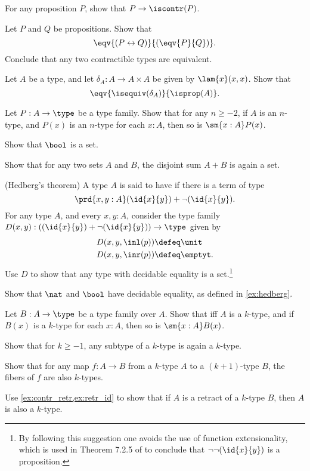\begin{exercises}
\item For any proposition $P$, show that $P\to\iscontr(P)$.
\item Let $P$ and $Q$ be propositions. Show that
\begin{equation*}
\eqv{(P\leftrightarrow Q)}{(\eqv{P}{Q})}.
\end{equation*}
Conclude that any two contractible types are equivalent.
\item Let $A$ be a type, and let $\delta_A:A\to A\times A$ be given by $\lam{x}(x,x)$. Show that
\begin{equation*}
\eqv{\isequiv(\delta_A)}{\isprop(A)}.
\end{equation*}
\item Let $P:A\to\type$ be a type family. Show that for any $n\geq-2$, if $A$ is an $n$-type, and $P(x)$ is an $n$-type for each $x:A$, then so is $\sm{x:A}P(x)$. 
\item Show that $\bool$ is a set.
\item Show that for any two sets $A$ and $B$, the disjoint sum $A+B$ is again a set.
\item \label{ex:hedberg}(Hedberg's theorem) A type $A$ is said to have  if there is a term of type
\begin{equation*}
\prd{x,y:A} (\id{x}{y})+\neg(\id{x}{y}).
\end{equation*}
For any type $A$, and every $x,y:A$, consider the type family $D(x,y):((\id{x}{y})+\neg(\id{x}{y}))\to\type$ given by
\begin{align*}
D(x,y,\inl(p)) & \defeq \unit \\
D(x,y,\inr(p)) & \defeq \emptyt.
\end{align*}
Use $D$ to show that any type with decidable equality is a set.\footnote{By following this suggestion one avoids the use of function extensionality, which is used in Theorem 7.2.5 of \cite{hottbook} to conclude that $\neg\neg(\id{x}{y})$ is a proposition.}
\item Show that $\nat$ and $\bool$ have decidable equality, as defined in \autoref{ex:hedberg}.
\item 
\begin{subexenum}
\item Let $B:A\to\type$ be a type family over $A$. Show that iff $A$ is a $k$-type, and if $B(x)$ is a $k$-type for each $x:A$, then so is $\sm{x:A}B(x)$.
\item Show that for $k\geq -1$, any subtype of a $k$-type is again a $k$-type.
\item Show that for any map $f:A\to B$ from a $k$-type $A$ to a $(k+1)$-type $B$, the fibers of $f$ are also $k$-types.
\end{subexenum}
\item Use \autoref{ex:contr_retr,ex:retr_id} to show that if $A$ is a retract of a $k$-type $B$, then $A$ is also a $k$-type.
\end{exercises}

